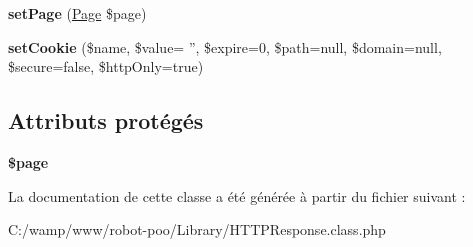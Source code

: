 \begin{DoxyCompactItemize}
\item 
\hypertarget{class_library_1_1_h_t_t_p_response_ae3f115da2755bb9149f98f560108b766}{{\bfseries set\+Page} (\hyperlink{class_library_1_1_page}{Page} \$page)}\label{class_library_1_1_h_t_t_p_response_ae3f115da2755bb9149f98f560108b766}

\item 
\hypertarget{class_library_1_1_h_t_t_p_response_ab152957f35ec33810e34d75f6837d2aa}{{\bfseries set\+Cookie} (\$name, \$value= '', \$expire=0, \$path=null, \$domain=null, \$secure=false, \$http\+Only=true)}\label{class_library_1_1_h_t_t_p_response_ab152957f35ec33810e34d75f6837d2aa}

\end{DoxyCompactItemize}
\subsection*{Attributs protégés}
\begin{DoxyCompactItemize}
\item 
\hypertarget{class_library_1_1_h_t_t_p_response_a0a44e6760141442bb439b1ab1395d8ff}{{\bfseries \$page}}\label{class_library_1_1_h_t_t_p_response_a0a44e6760141442bb439b1ab1395d8ff}

\end{DoxyCompactItemize}


La documentation de cette classe a été générée à partir du fichier suivant \+:\begin{DoxyCompactItemize}
\item 
C\+:/wamp/www/robot-\/poo/\+Library/H\+T\+T\+P\+Response.\+class.\+php\end{DoxyCompactItemize}
